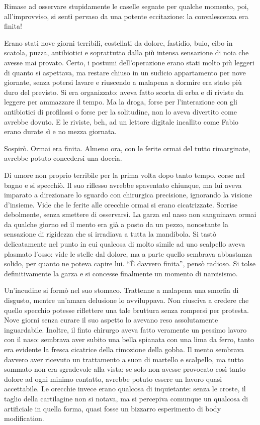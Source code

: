 Rimase ad osservare stupidamente le caselle segnate per qualche momento, poi, all'improvviso, si sentì pervaso da una potente eccitazione: la convalescenza era finita!

Erano stati nove giorni terribili, costellati da dolore, fastidio, buio, cibo in scatola, puzza, antibiotici e soprattutto dalla più intensa sensazione di noia che avesse mai provato. Certo, i postumi dell'operazione erano stati molto più leggeri di quanto si aspettava, ma restare chiuso in un sudicio appartamento per nove giornate, senza potersi lavare e riuscendo a malapena a dormire era stato più duro del previsto. Si era organizzato: aveva fatto scorta di erba e di riviste da leggere per ammazzare il tempo. Ma la droga, forse per l'interazione con gli antibiotici di profilassi o forse per la solitudine, non lo aveva divertito come avrebbe dovuto. E le riviste, beh, ad un lettore digitale incallito come Fabio erano durate sì e no mezza giornata.

Sospirò. Ormai era finita. Almeno ora, con le ferite ormai del tutto rimarginate, avrebbe potuto concedersi una doccia.

Di umore non proprio terribile per la prima volta dopo tanto tempo, corse nel bagno e si specchiò. Il suo riflesso avrebbe spaventato chiunque, ma lui aveva imparato a direzionare lo sguardo con chirurgica precisione, ignorando la visione d'insieme. Vide che le ferite alle orecchie ormai si erano cicatrizzate. Sorrise debolmente, senza smettere di osservarsi. La garza sul naso non sanguinava ormai da qualche giorno ed il mento era già a posto da un pezzo, nonostante la sensazione di rigidezza che si irradiava a tutta la mandibola. Si tastò delicatamente nel punto in cui qualcosa di molto simile ad uno scalpello aveva plasmato l'osso: vide le stelle dal dolore, ma a parte quello sembrava abbastanza solido, per quanto ne poteva capire lui. ``È davvero finita'', pensò radioso. Si tolse definitivamente la garza e si concesse finalmente un momento di narcisismo.

Un'incudine si formò nel suo stomaco. Trattenne a malapena una smorfia di disgusto, mentre un'amara delusione lo avviluppava. Non riusciva a credere che quello specchio potesse riflettere una tale bruttura senza rompersi per protesta. Nove giorni senza curare il suo aspetto lo avevano reso assolutamente inguardabile. Inoltre, il finto chirurgo aveva fatto veramente un pessimo lavoro con il naso: sembrava aver subito una bella spianata con una lima da ferro, tanto era evidente la fresca cicatrice della rimozione della gobba. Il mento sembrava davvero aver ricevuto un trattamento a suon di martello e scalpello, ma tutto sommato non era sgradevole alla vista; se solo non avesse provocato così tanto dolore ad ogni minimo contatto, avrebbe potuto essere un lavoro quasi accettabile. Le orecchie invece erano qualcosa di inquietante: senza le croste, il taglio della cartilagine non si notava, ma si percepiva comunque un qualcosa di artificiale in quella forma, quasi fosse un bizzarro esperimento di body modification.

